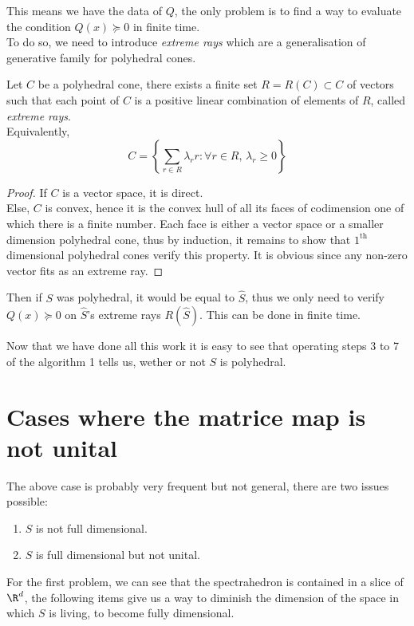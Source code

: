 \documentclass[english, mathematiques, theoremes, diagrammes, dessin, a4paper, margin = 2cm]{article-perso}
\begin{document}
This means we have the data of $Q$, the only problem is to find a way to evaluate the condition $Q(x) \succcurlyeq 0$ in finite time.\\
To do so, we need to introduce \emph{extreme rays} which are a generalisation of generative family for polyhedral cones.

\begin{proposition}
	Let $C$ be a polyhedral cone, there exists a finite set $R = R(C) \subset C$ of vectors such that each point of $C$ is a positive linear combination of elements of $R$, called \emph{extreme rays}.\\
	Equivalently,
	\[C = \left\{ \sum\limits_{r \in R} \lambda_r r : \forall r \in R, \, \lambda_r \geqslant 0\right\} \]
\end{proposition}

\begin{proof}
	If $C$ is a vector space, it is direct.\\
	Else, $C$ is convex, hence it is the convex hull of all its faces of codimension one of which there is a finite number. Each face is either a vector space or a smaller dimension polyhedral cone, thus by induction, it remains to show that $1^{\text{th}}$ dimensional polyhedral cones verify this property. It is obvious since any non-zero vector fits as an extreme ray.
\end{proof}

Then if $S$ was polyhedral, it would be equal to $\hat{S}$, thus we only need to verify $Q(x) \succcurlyeq 0$ on $\hat{S}$'s extreme rays $R(\hat{S})$. This can be done in finite time.
\medskip

Now that we have done all this work it is easy to see that operating steps 3 to 7 of the algorithm 1 tells us, wether or not $S$ is polyhedral.

\section{Cases where the matrice map is not unital}

The above case is probably very frequent but not general, there are two issues possible:
\begin{enumerate}[label = \arabic*.]
	\item $S$ is not full dimensional.
	\item $S$ is full dimensional but not unital.
\end{enumerate}

For the first problem, we can see that the spectrahedron is contained in a slice of $\R^d$, the following items give us a way to diminish the dimension of the space in which $S$ is living, to become fully dimensional.
\end{document}
